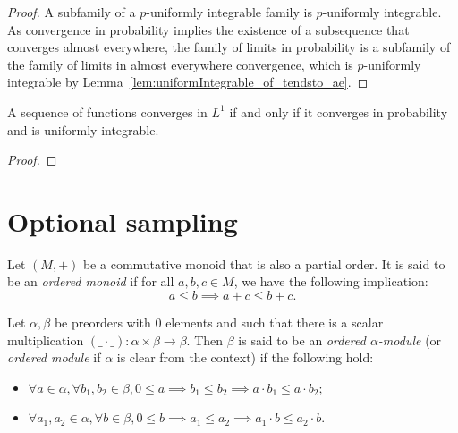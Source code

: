\begin{proof}
  A subfamily of a $p$-uniformly integrable family is $p$-uniformly integrable. As convergence in probability implies the existence of a subsequence that converges almost everywhere, the family of limits in probability is a subfamily of the family of limits in almost everywhere convergence, which is $p$-uniformly integrable by Lemma~\ref{lem:uniformIntegrable_of_tendsto_ae}.
\end{proof}

\begin{lemma}\label{lem:vitali}
  \mathlibok
  A sequence of functions converges in $L^1$ if and only if it converges in probability and is uniformly integrable.
\end{lemma}

\begin{proof}
\end{proof}

\section{Optional sampling}

\begin{definition}\label{def:isOrderedAddMonoid}
  \mathlibok
Let $(M, +)$ be a commutative monoid that is also a partial order. It is said to be an \emph{ordered monoid} if for all $a, b, c \in M$, we have the following implication:
$$a \le b \implies a + c \le b + c.$$
\end{definition}

\begin{definition}\label{def:isOrderedModule}
  \mathlibok
Let $\alpha, \beta$ be preorders with $0$ elements and such that there is a scalar multiplication $(\_ \cdot \_) : \alpha \times \beta \to \beta$. Then $\beta$ is said to be an \emph{ordered $\alpha$-module} (or \emph{ordered module} if $\alpha$ is clear from the context) if the following hold:
\begin{itemize}
  \item $\forall a \in \alpha, \forall b_1, b_2 \in \beta, 0 \le a \implies b_1 \le b_2 \implies a \cdot b_1 \le a \cdot b_2$;
  \item $\forall a_1, a_2 \in \alpha, \forall b \in \beta, 0 \le b \implies a_1 \le a_2 \implies a_1 \cdot b \le a_2 \cdot b$.
\end{itemize}
\end{definition}

